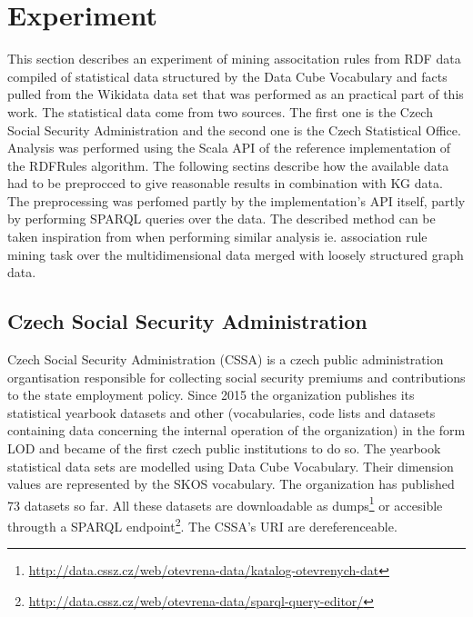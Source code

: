 \chapter{Experiment}


This section describes an experiment of mining associtation rules from RDF data compiled of statistical data structured by the Data Cube Vocabulary and facts pulled from the Wikidata data set that was performed as an practical part of this work. The statistical data come from two sources. The first one is the Czech Social Security Administration and the second one is the Czech Statistical Office. Analysis was performed using the Scala API of the reference implementation of the RDFRules algorithm. The following sectins describe how the available data had to be preprocced to give reasonable results in combination with KG data. The preprocessing was perfomed partly by the implementation's API itself, partly by performing SPARQL queries over the data. The described method can be taken inspiration from when performing similar analysis ie. association rule mining task over the multidimensional data merged with loosely structured graph data. 

\section{Czech Social Security Administration}

Czech Social Security Administration (CSSA) is a czech public administration organtisation responsible for collecting social security premiums and contributions to the state employment policy. Since 2015 the organization publishes its statistical yearbook datasets and other (vocabularies, code lists and datasets containing data concerning the internal operation of the organization) in the form LOD and became of the first czech public institutions to do so. The yearbook statistical data sets are modelled using Data Cube Vocabulary. Their dimension values are represented by the SKOS vocabulary. The organization has published 73 datasets so far. All these datasets are downloadable as dumps\footnote{\href{http://data.cssz.cz/web/otevrena-data/katalog-otevrenych-dat}{http://data.cssz.cz/web/otevrena-data/katalog-otevrenych-dat}} or accesible througth a SPARQL endpoint\footnote{\href{http://data.cssz.cz/web/otevrena-data/sparql-query-editor/}{http://data.cssz.cz/web/otevrena-data/sparql-query-editor/}}. The CSSA's URI are dereferenceable.

